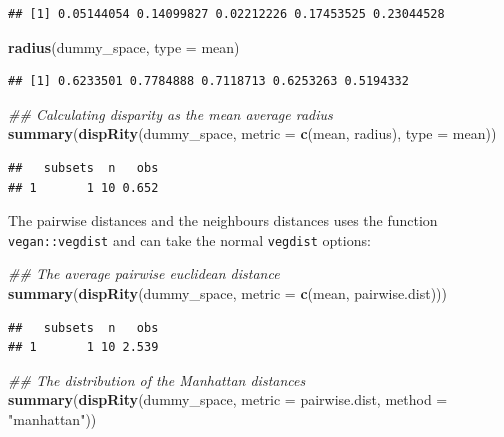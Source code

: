 \documentclass[]{book}
\newenvironment{Shaded}{\begin{snugshade}}{\end{snugshade}}
\newcommand{\CommentTok}[1]{\textcolor[rgb]{0.56,0.35,0.01}{\textit{#1}}}
\newcommand{\DataTypeTok}[1]{\textcolor[rgb]{0.13,0.29,0.53}{#1}}
\newcommand{\KeywordTok}[1]{\textcolor[rgb]{0.13,0.29,0.53}{\textbf{#1}}}
\newcommand{\NormalTok}[1]{#1}
\newcommand{\StringTok}[1]{\textcolor[rgb]{0.31,0.60,0.02}{#1}}
\begin{document}
\begin{verbatim}
## [1] 0.05144054 0.14099827 0.02212226 0.17453525 0.23044528
\end{verbatim}

\begin{Shaded}
\begin{Highlighting}[]
\KeywordTok{radius}\NormalTok{(dummy_space, }\DataTypeTok{type =}\NormalTok{ mean)}
\end{Highlighting}
\end{Shaded}

\begin{verbatim}
## [1] 0.6233501 0.7784888 0.7118713 0.6253263 0.5194332
\end{verbatim}

\begin{Shaded}
\begin{Highlighting}[]
\CommentTok{## Calculating disparity as the mean average radius}
\KeywordTok{summary}\NormalTok{(}\KeywordTok{dispRity}\NormalTok{(dummy_space,}
                 \DataTypeTok{metric =} \KeywordTok{c}\NormalTok{(mean, radius),}
                 \DataTypeTok{type =}\NormalTok{ mean))}
\end{Highlighting}
\end{Shaded}

\begin{verbatim}
##   subsets  n   obs
## 1       1 10 0.652
\end{verbatim}

The pairwise distances and the neighbours distances uses the function \texttt{vegan::vegdist} and can take the normal \texttt{vegdist} options:

\begin{Shaded}
\begin{Highlighting}[]
\CommentTok{## The average pairwise euclidean distance}
\KeywordTok{summary}\NormalTok{(}\KeywordTok{dispRity}\NormalTok{(dummy_space, }\DataTypeTok{metric =} \KeywordTok{c}\NormalTok{(mean, pairwise.dist)))}
\end{Highlighting}
\end{Shaded}

\begin{verbatim}
##   subsets  n   obs
## 1       1 10 2.539
\end{verbatim}

\begin{Shaded}
\begin{Highlighting}[]
\CommentTok{## The distribution of the Manhattan distances}
\KeywordTok{summary}\NormalTok{(}\KeywordTok{dispRity}\NormalTok{(dummy_space, }\DataTypeTok{metric =}\NormalTok{ pairwise.dist,}
                 \DataTypeTok{method =} \StringTok{"manhattan"}\NormalTok{))}
\end{Highlighting}
\end{Shaded}
\end{document}
